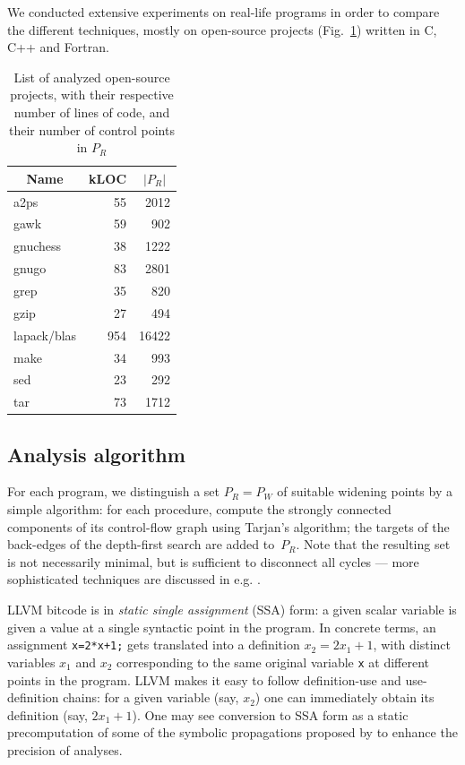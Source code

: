 \documentclass[preprint]{sigplanconf}
\begin{document}
We conducted extensive experiments on real-life programs in order to compare the
different techniques, mostly on open-source projects (Fig.~\ref{fig:projects}) written in C, C++ and Fortran.

\begin{table}[!h]
	\centering
\begin{tabular}{|l|r|r|} \hline
	\multicolumn{1}{|c|}{Name} &
        \multicolumn{1}{c|}{kLOC} &
        \multicolumn{1}{c|}{$|P_R|$} \\ \hline
	a2ps & 55 & 2012\\
	gawk & 59 & 902\\ 
	gnuchess & 38 & 1222\\ 
	gnugo & 83 & 2801\\
	grep & 35 & 820\\
	gzip & 27 & 494\\
	lapack/blas & 954 & 16422\\
	make & 34 & 993\\ 
	sed & 23 & 292\\
	tar & 73 & 1712\\
	\hline
\end{tabular}
\caption{List of analyzed open-source projects, with their respective number of
lines of code, and their number of control points in $P_R$}
\label{fig:projects}
\end{table}

\subsection{Analysis algorithm}
\label{sec:analysis-algorithm}
For each program, we distinguish a set $P_R = P_W$ of suitable widening points by a simple algorithm: for each procedure, compute the strongly connected components of its control-flow graph using Tarjan's algorithm; the targets of the back-edges of the depth-first search are added to~$P_R$. Note that the resulting set is not necessarily minimal, but is sufficient to disconnect all cycles --- more sophisticated techniques are discussed in e.g. \citet{BourdonclePhd}.

LLVM bitcode is in \emph{static single assignment} (SSA) form: a given scalar variable is given a value at a single syntactic point in the program. In concrete terms, an assignment \lstinline|x=2*x+1;| gets translated into a definition $x_2 = 2x_1+1$, with distinct variables $x_1$ and $x_2$ corresponding to the same original variable \lstinline|x| at different points in the program.
LLVM makes it easy to follow definition-use and use-definition chains: for a given variable (say, $x_2$) one can immediately obtain its definition (say, $2x_1+1$).
One may see conversion to SSA form as a static precomputation of some of the symbolic propagations proposed by \citet{DBLP:conf/vmcai/Mine06} to enhance the precision of analyses.
\end{document}
